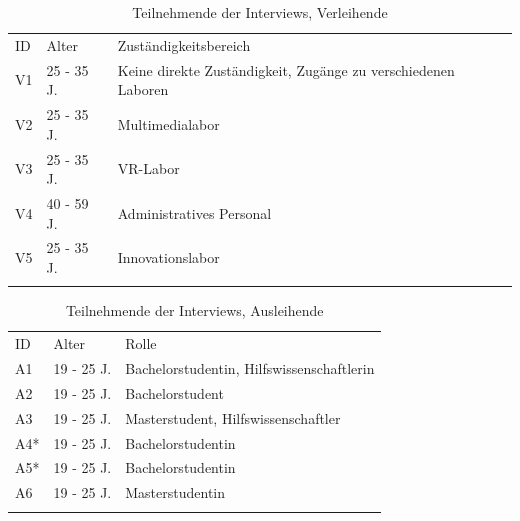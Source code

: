 \begin{table}[h]
        \centering
        \caption{Teilnehmende der Interviews, Verleihende}
        \begin{tabular}{lll}
                \arrayrulecolor{maincolor}\arrayrulecolor{maincolor}\hline
                \sffamily\color{maincolor}ID & \sffamily\color{maincolor}Alter &
                \sffamily\color{maincolor}Zuständigkeitsbereich \\
                \arrayrulecolor{maincolor}\arrayrulecolor{maincolor}\hline
                V1                           & 25 - 35 J.                      & Keine direkte
                Zuständigkeit, Zugänge zu verschiedenen Laboren    \\
                V2                           & 25 - 35 J.                      & Multimedialabor \\
                V3                           & 25 - 35 J.                      & VR-Labor \\
                V4                           & 40 - 59 J.                      & Administratives
                Personal                                         \\
                V5                           & 25 - 35 J.                      & Innovationslabor \\
                \arrayrulecolor{maincolor}\arrayrulecolor{maincolor}\hline
        \end{tabular}
        \label{table:v}
\end{table}

\begin{table}[h]
        \centering
        \caption{Teilnehmende der Interviews, Ausleihende}
        \begin{tabular}{lll}
                \arrayrulecolor{maincolor}\arrayrulecolor{maincolor}\hline
                \sffamily\color{maincolor}ID &  \sffamily\color{maincolor}Alter &
                \sffamily\color{maincolor}Rolle \\
                \arrayrulecolor{maincolor}\arrayrulecolor{maincolor}\hline
                A1                     & 19 - 25 J.       & Bachelorstudentin, Hilfswissenschaftlerin \\
                A2                     & 19 - 25 J.       & Bachelorstudent \\
                A3                     & 19 - 25 J.       & Masterstudent, Hilfswissenschaftler \\
                A4*                    & 19 - 25 J.       & Bachelorstudentin \\
                A5*                    & 19 - 25 J.       & Bachelorstudentin \\
                A6                     & 19 - 25 J.       & Masterstudentin \\
                \arrayrulecolor{maincolor}\arrayrulecolor{maincolor}\hline
        \end{tabular}
        \label{table:a}
\end{table}

